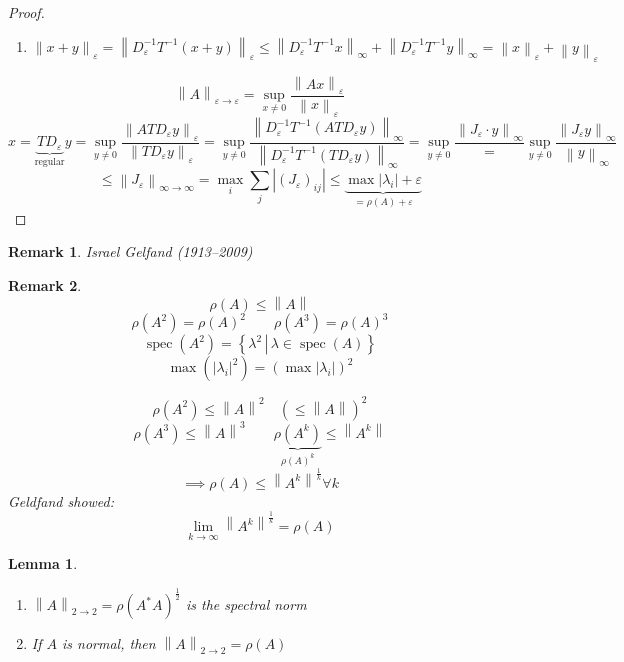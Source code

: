 \documentclass{article}
\newtheorem{lemma}{Lemma}  \numberwithin{lemma}{section}
\newtheorem{remark}{Remark}  \numberwithin{remark}{section}
\newcommand{\setdef}[2]{\left\{\left.#1\,\right|\,#2\right\}}
\newcommand{\norm}[1]{\left\|#1\right\|}
\newcommand{\card}[1]{\left|#1\right|}
\begin{document}
\begin{proof}
\begin{enumerate}
    \item $\norm{x + y}_{\varepsilon} = \norm{D_{\varepsilon}^{-1} T^{-1} (x + y)}_{\varepsilon} \leq \norm{D_{\varepsilon}^{-1} T^{-1} x}_{\infty} + \norm{D^{-1}_{\varepsilon} T^{-1} y}_{\infty} = \norm{x}_{\varepsilon} + \norm{y}_{\varepsilon}$
  \end{enumerate}
  \[ \norm{A}_{\varepsilon\to\varepsilon} = \sup_{x \neq 0} \frac{\norm{Ax}_{\varepsilon}}{\norm{x}_{\varepsilon}} \]
  \[ x = \underbrace{TD_{\varepsilon}}_{\text{regular}} y = \sup_{y \neq 0} \frac{\norm{AT D_{\varepsilon} y}_{\varepsilon}}{\norm{TD_{\varepsilon} y}_{\varepsilon}} = \sup_{y \neq 0} \frac{\norm{D_{\varepsilon}^{-1} T^{-1} \left(ATD_{\varepsilon} y\right)}_{\infty}}{\norm{D_{\varepsilon}^{-1} T^{-1} \left(TD_{\varepsilon} y\right)}_{\infty}} = \sup_{y \neq 0} \frac{\norm{J_{\varepsilon} \cdot y}_{\infty}} = \sup_{y \neq 0} \frac{\norm{J_{\varepsilon} y}_{\infty}}{\norm{y}_{\infty}} \]
  \[ \leq \norm{J_{\varepsilon}}_{\infty \to \infty} = \max_i \sum_j \card{(J_{\varepsilon})_{ij}} \leq \underbrace{\max \card{\lambda_i} + \varepsilon}_{= \rho(A) + \varepsilon} \]
\end{proof}

\begin{remark}
  Israel Gelfand (1913--2009)
\end{remark}

\begin{remark} %
  \[ \rho(A) \leq \norm{A} \]
  \[ \rho(A^2) = \rho(A)^2 \qquad \rho(A^3) = \rho(A)^3 \]
  \[ \operatorname{spec}(A^2) = \setdef{\lambda^2}{\lambda \in \operatorname{spec}(A)} \]
  \[ \max(\card{\lambda_i}^2) = \left(\max\card{\lambda_i}\right)^2 \]

  \[ \rho(A^2) \leq \norm{A}^2 \quad (\leq \norm{A})^2 \]
  \[ \rho(A^3) \leq \norm{A}^3 \qquad \underbrace{\rho(A^k)}_{\rho(A)^k} \leq \norm{A^k} \]
  \[ \implies \rho(A) \leq \norm{A^k}^{\frac1k} \forall k \]
  Geldfand showed:
  \[ \lim_{k\to\infty} \norm{A^k}^{\frac1k} = \rho(A) \]
\end{remark}

\begin{lemma} %
  \begin{enumerate}
    \item $\norm{A}_{2\to2} = \rho(A^* A)^{\frac12}$ is the \emph{spectral norm}
    \item If $A$ is normal, then $\norm{A}_{2\to2} = \rho(A)$
  \end{enumerate}
\end{lemma}
\end{document}
